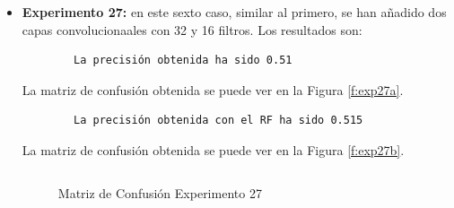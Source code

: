 \begin{itemize}
    \item \textbf{Experimento 27:} en este sexto caso, similar al primero, se han añadido dos capas convolucionaales con 32 y 16 filtros. Los resultados son:
    \begin{verbatim}
        La precisión obtenida ha sido 0.51
    \end{verbatim}
    La matriz de confusión obtenida se puede ver en la Figura \ref{f:exp27a}.
    \begin{verbatim}
        La precisión obtenida con el RF ha sido 0.515
    \end{verbatim}
    La matriz de confusión obtenida se puede ver en la Figura \ref{f:exp27b}.
    \begin{verbatim}
    \end{verbatim}
    \begin{figure}[h]
     \centering
     \caption{Matriz de Confusión Experimento 27}
     \label{f:exp27}
    \end{figure}    
    

\end{itemize}

